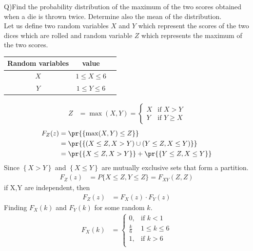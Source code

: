 \documentclass[journal,12pt,twocolumn]{IEEEtran}
\begin{document}
Q)Find the probability distribution of the maximum of the two scores obtained
when a die is thrown twice. Determine also the mean of the distribution.
\\
   \solution Let us define two random variables $X$ and $Y$ which represent the scores of the two dices which are rolled and random variable $Z$ which represents the maximum of the two scores.\\
\begin{table}[!ht]
\begin{tabular}{|c|c|c|}
	\hline
	\textbf{Random variables} & \textbf{value} \\
	\hline
	$X$ & $1 \leq X \leq 6$ \\
	\hline
	$Y$ & $1 \leq Y \leq 6$ \\
	\hline
\end{tabular}
\end{table} 
\begin{align}
Z &= \max(X, Y) \mathrel{=}
    \begin{cases}
    X & \text{if } X > Y \\
    Y & \text{if } Y \geq X
    \end{cases}
\end{align}
\begin{align}
F_Z(z) &= \pr{\{ \max(X, Y) \leq Z \}} \\
&= \pr{\left\{ (X \leq Z , X > Y) \cup (Y \leq Z , X \leq Y) \right\}} \\
&= \pr{\{X \leq Z, X > Y\}} + \pr{\{Y \leq Z, X \leq Y\}}
\end{align}
Since $\left\{X > Y\right\}$ and $\left\{X \le Y\right\}$ are mutually exclusive sets that form a partition.
\begin{align}
F_Z(z) &= P\{X \leq Z, Y \leq Z\} \mathrel{=} 
        F_{XY}(Z, Z)
\end{align}
if X,Y are independent, then
\begin{align}
F_Z(z) &= F_X(z) \cdot F_Y(z)
\end{align}
Finding $F_X(k)$ and $F_Y(k)$ for some random $k$.
\begin{align}
F_X(k) &=
    \begin{cases}
    0, & \text{if } k < 1 \\
    \frac{k}{6} & 1 \leq k \leq 6\\
    1, &  \text{if } k > 6 \\
    \end{cases}
\end{align}
\end{document}
